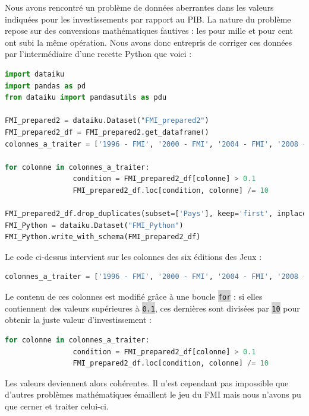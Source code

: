 \documentclass[hidelinks, 12pt]{report}
\newcommand{\code}[1]{\colorbox{LightGray}{\texttt{#1}}}
\begin{document}
Nous avons rencontré un problème de données aberrantes dans les valeurs indiquées pour les investissements par rapport au PIB. La nature du problème repose sur des conversions mathématiques fautives : les pour mille et pour cent ont subi la même opération. Nous avons donc entrepris de corriger ces données par l'intermédiaire d'une recette Python que voici :

\label{python}\begin{lstlisting}[language=python]
import dataiku
import pandas as pd
from dataiku import pandasutils as pdu

FMI_prepared2 = dataiku.Dataset("FMI_prepared2")
FMI_prepared2_df = FMI_prepared2.get_dataframe()
colonnes_a_traiter = ['1996 - FMI', '2000 - FMI', '2004 - FMI', '2008 - FMI', '2012 - FMI', '2016 - FMI']

for colonne in colonnes_a_traiter:
				condition = FMI_prepared2_df[colonne] > 0.1
				FMI_prepared2_df.loc[condition, colonne] /= 10

FMI_prepared2_df.drop_duplicates(subset=['Pays'], keep='first', inplace=True)
FMI_Python = dataiku.Dataset("FMI_Python")
FMI_Python.write_with_schema(FMI_prepared2_df)
\end{lstlisting}

Le code ci-dessus intervient sur les colonnes des six éditions des Jeux :

\begin{lstlisting}[language=python]	
colonnes_a_traiter = ['1996 - FMI', '2000 - FMI', '2004 - FMI', '2008 - FMI', '2012 - FMI', '2016 - FMI']
\end{lstlisting}

Le contenu de ces colonnes est modifié grâce à une boucle \code{for} : si elles contiennent des valeurs supérieures à \code{0.1}, ces dernières sont divisées par \code{10} pour obtenir la juste valeur d'investissement :

\begin{lstlisting}[language=python]
for colonne in colonnes_a_traiter:
				condition = FMI_prepared2_df[colonne] > 0.1
				FMI_prepared2_df.loc[condition, colonne] /= 10
\end{lstlisting}

Les valeurs deviennent alors cohérentes. Il n'est cependant pas impossible que d'autres problèmes mathématiques émaillent le jeu du FMI mais nous n'avons pu que cerner et traiter celui-ci. 





%
\end{document}
